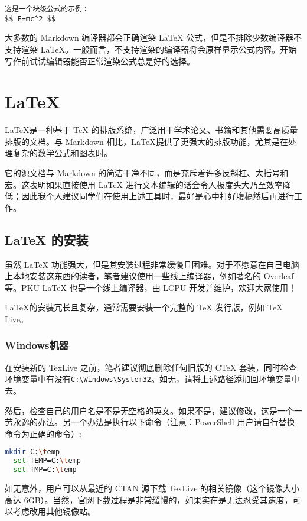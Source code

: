 \documentclass[../main.tex]{subfiles}
\begin{document}
\begin{lstlisting}
这是一个块级公式的示例：
$$ E=mc^2 $$
\end{lstlisting}

大多数的 Markdown 编译器都会正确渲染 LaTeX 公式，但是不排除少数编译器不支持渲染 LaTeX。一般而言，不支持渲染的编译器将会原样显示公式内容。开始写作前试试编辑器能否正常渲染公式总是好的选择。

\section{\LaTeX}

\LaTeX 是一种基于 TeX 的排版系统，广泛用于学术论文、书籍和其他需要高质量排版的文档。与 Markdown 相比，\LaTeX 提供了更强大的排版功能，尤其是在处理复杂的数学公式和图表时。

它的源文档与 Markdown 的简洁干净不同，而是充斥着许多反斜杠、大括号和宏。这表明如果直接使用 LaTeX 进行文本编辑的话会令人极度头大乃至效率降低；因此我个人建议同学们在使用上述工具时，最好是心中打好腹稿然后再进行工作。

\subsection{LaTeX 的安装}

虽然 LaTeX 功能强大，但是其安装过程非常缓慢且困难。对于不愿意在自己电脑上本地安装这东西的读者，笔者建议使用一些线上编译器，例如著名的 Overleaf 等。PKU LaTeX 也是一个线上编译器，由 LCPU 开发并维护，欢迎大家使用！

LaTeX的安装冗长且复杂，通常需要安装一个完整的 TeX 发行版，例如 TeX Live。

\subsubsection{Windows机器}

在安装新的 TexLive 之前，笔者建议彻底删除任何旧版的 CTeX 套装，同时检查环境变量中有没有\texttt{C:\textbackslash Windows\textbackslash System32}。如无，请将上述路径添加回环境变量中去。

然后，检查自己的用户名是不是无空格的英文。如果不是，建议修改，这是一个一劳永逸的办法。另一个办法是执行以下命令（注意：PowerShell 用户请自行替换命令为正确的命令）:

\begin{lstlisting}[language=bash]
  mkdir C:\temp
  set TEMP=C:\temp
  set TMP=C:\temp
\end{lstlisting}

如无意外，用户可以从最近的 CTAN 源下载 TexLive 的相关镜像（这个镜像大小高达 6GB）。当然，官网下载过程是非常缓慢的，如果实在是无法忍受其速度，可以考虑改用其他镜像站。
\end{document}
